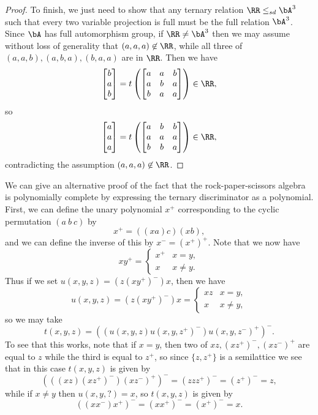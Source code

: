 \begin{proof}
To finish, we just need to show that any ternary relation $\RR \le_{sd} \bA^3$ such that every two variable projection is full must be the full relation $\bA^3$. Since $\bA$ has full automorphism group, if $\RR \ne \bA^3$ then we may assume without loss of generality that $(a,a,a) \not\in \RR$, while all three of $(a,a,b),(a,b,a),(b,a,a)$ are in $\RR$. Then we have
\[
\begin{bmatrix} b\\ a\\ b\end{bmatrix} = t\left(\begin{bmatrix} a & a & b\\ a & b & a\\ b & a & a \end{bmatrix}\right) \in \RR,
\]
so
\[
\begin{bmatrix} a\\ a\\ a\end{bmatrix} = t\left(\begin{bmatrix} a & b & b\\ a & a & a\\ b & b & a \end{bmatrix}\right) \in \RR,
\]
contradicting the assumption $(a,a,a) \not\in \RR$.
\end{proof}

\begin{ex} We can give an alternative proof of the fact that the rock-paper-scissors algebra is polynomially complete by expressing the ternary discriminator as a polynomial. First, we can define the unary polynomial $x^+$ corresponding to the cyclic permutation $(a\ b\ c)$ by
\[
x^+ = ((xa)c)(xb),
\]
and we can define the inverse of this by $x^- = (x^+)^+$.
Note that we now have
\[
xy^+ = \begin{cases} x^+ & x = y,\\ x & x\ne y.\end{cases}
\]
Thus if we set $u(x,y,z) = (z(xy^+)^-)x$, then we have
\[
u(x,y,z) = (z(xy^+)^-)x = \begin{cases} xz & x = y,\\ x & x \ne y,\end{cases}
\]
so we may take
\[
t(x,y,z) = ((u(x,y,z)u(x,y,z^+)^-)u(x,y,z^-)^+)^-.
\]
To see that this works, note that if $x=y$, then two of $xz, (xz^+)^-, (xz^-)^+$ are equal to $z$ while the third is equal to $z^+$, so since $\{z,z^+\}$ is a semilattice we see that in this case $t(x,y,z)$ is given by
\[
(((xz)(xz^+)^-)(xz^-)^+)^- = (zzz^+)^- = (z^+)^- = z,
\]
while if $x \ne y$ then $u(x,y,?) = x$, so $t(x,y,z)$ is given by
\[
((xx^-)x^+)^- = (xx^+)^- = (x^+)^- = x.
\]
\end{ex}

